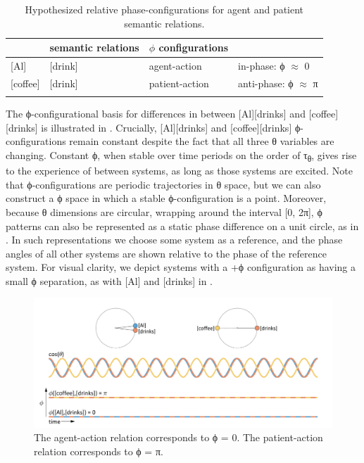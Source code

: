   \begin{table}
\begin{tabularx}{\textwidth}{XXll}
  \lsptoprule
  \multicolumn{2}{c}{\textbf{conceptual systems}} & 
  \textbf{semantic relations} & 
  \textbf{$\phi$ configurations}\\
  \midrule{}
  [Al] & [drink] & agent-action & in-phase: ϕ ${\approx}$ 0\\{}
  [coffee] & [drink] & patient-action & anti-phase: ϕ ${\approx}$ π\\
  \lspbottomrule
  \end{tabularx}
\caption{Hypothesized relative phase-configurations for agent and patient semantic relations.}
\label{tab:1:1}
\end{table}

  The ϕ-configurational basis for differences in  between [Al][drinks] and [coffee][drinks] is illustrated in {}. Crucially, [Al][drinks] and [coffee][drinks] ϕ-configurations remain constant despite the fact that all three θ variables are changing. Constant ϕ, when stable over time periods on the order of τ\textsubscript{θ}, gives rise to the experience of  between systems, as long as those systems are excited. Note that ϕ-configurations are periodic trajectories in θ space, but we can also construct a ϕ space in which a stable ϕ-configuration is a point. Moreover, because θ dimensions are circular, wrapping around the interval [0, 2π], ϕ patterns can also be represented as a static phase difference on a unit circle, as in {}. In such representations we choose some system as a reference, and the phase angles of all other systems are shown relative to the phase of the reference system. For visual clarity, we depict systems with a +ϕ configuration as having a small ϕ separation, as with [Al] and [drinks] in {}.

  
\begin{figure}
\includegraphics[width=\textwidth]{figures/Tilsen-img15.png}
\caption{The agent-action relation corresponds to ϕ = 0. The patient-action relation corresponds to ϕ = π.}
\label{fig:2:8}
\end{figure}
 

